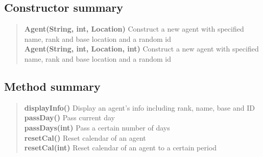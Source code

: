 {{{\subsection{Constructor summary}{
\begin{verse}
{\bf Agent(String, int, Location)} Construct a new agent with specified name, rank and base location and a random id\\
{\bf Agent(String, int, Location, int)} Construct a new agent with specified name, rank and base location and a random id\\
\end{verse}
}
\subsection{Method summary}{
\begin{verse}
{\bf displayInfo()} Display an agent's info including rank, name, base and ID\\
{\bf passDay()} Pass current day\\
{\bf passDays(int)} Pass a certain number of days\\
{\bf resetCal()} Reset calendar of an agent\\
{\bf resetCal(int)} Reset calendar of an agent to a certain period\\
\end{verse}
}
}}}
